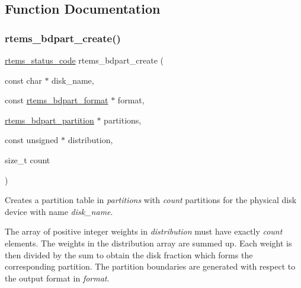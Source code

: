 \subsection{Function Documentation}
\mbox{\label{group__rtems__bdpart_ga208abbe74a399a6e38115ab8eeab6eb5}} 
\subsubsection{\texorpdfstring{rtems\_bdpart\_create()}{rtems\_bdpart\_create()}}
{\footnotesize\ttfamily \mbox{\hyperlink{group__ClassicStatus_ga545d41846817eaba6143d52ee4d9e9fe}{rtems\+\_\+status\+\_\+code}} rtems\+\_\+bdpart\+\_\+create (\begin{DoxyParamCaption}\item[{const char $\ast$}]{disk\+\_\+name,  }\item[{const \mbox{\hyperlink{unionrtems__bdpart__format}{rtems\+\_\+bdpart\+\_\+format}} $\ast$}]{format,  }\item[{\mbox{\hyperlink{structrtems__bdpart__partition}{rtems\+\_\+bdpart\+\_\+partition}} $\ast$}]{partitions,  }\item[{const unsigned $\ast$}]{distribution,  }\item[{size\+\_\+t}]{count }\end{DoxyParamCaption})}



Creates a partition table in {\itshape partitions} with {\itshape count} partitions for the physical disk device with name {\itshape disk\+\_\+name}. 

The array of positive integer weights in {\itshape distribution} must have exactly {\itshape count} elements. The weights in the distribution array are summed up. Each weight is then divided by the sum to obtain the disk fraction which forms the corresponding partition. The partition boundaries are generated with respect to the output format in {\itshape format}. \mbox{\label{group__rtems__bdpart_gaac90511f26e1d224e9e821d4b5c1d064}} 
